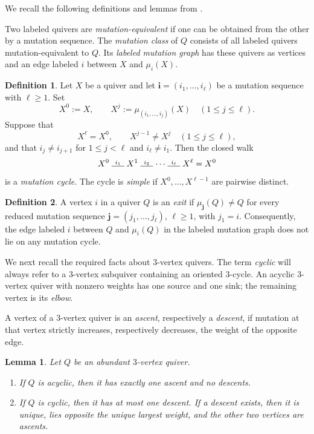\documentclass[10pt,a4paper]{amsart}
\newtheorem{lemma}[lemma]{Lemma}
\theoremstyle{definition}
\newtheorem{definition}[definition]{Definition}
\theoremstyle{definition}
\numberwithin{equation}{section}
\numberwithin{table}{section}
\begin{document}
We recall the following definitions and lemmas from \cite{FN25}.

Two labeled quivers are \emph{mutation-equivalent} if one can be obtained
from the other by a mutation sequence. The \emph{mutation class} of $Q$
consists of all labeled quivers mutation-equivalent to $Q$. Its \emph{labeled
mutation graph} has these quivers as vertices and an edge labeled $i$ between
$X$ and $\mu_i(X)$.

\begin{definition}\label{def:mutation-cycle}
Let $X$ be a quiver and let $\mathbf i=(i_1,\ldots,i_\ell)$ be a mutation
sequence with $\ell\geq1$. Set
\[
 X^0:=X,\qquad
 X^j:=\mu_{(i_1,\ldots,i_j)}(X)\quad(1\leq j\leq \ell).
\]
Suppose that
\[
 X^\ell=X^0,\qquad X^{j-1}\neq X^j\quad(1\leq j\leq \ell),
\]
and that $i_j\neq i_{j+1}$ for $1\leq j<\ell$ and $i_\ell\neq i_1$. Then the closed walk
\[
 X^0\mathrel{\mathop{\rule{1.5em}{0.4pt}}\limits^{i_1}}X^1
 \mathrel{\mathop{\rule{1.5em}{0.4pt}}\limits^{i_2}}\cdots
 \mathrel{\mathop{\rule{1.5em}{0.4pt}}\limits^{i_\ell}}X^\ell=X^0
\]
is a \emph{mutation cycle}. The cycle is
\emph{simple} if $X^0,\ldots,X^{\ell-1}$ are pairwise distinct.
\end{definition}

\begin{definition}\label{def:exit}
A vertex $i$ in a quiver $Q$ is an \emph{exit} if
$\mu_{\mathbf j}(Q)\neq Q$ for every reduced mutation sequence
$\mathbf j=(j_1,\ldots,j_\ell)$, $\ell\geq1$, with $j_1=i$.
Consequently, the edge labeled $i$ between $Q$ and $\mu_i(Q)$ in the labeled
mutation graph does not lie on any mutation cycle.
\end{definition}

We next recall the required facts about $3$-vertex quivers. The term
\emph{cyclic} will always refer to a $3$-vertex subquiver containing an
oriented $3$-cycle. An acyclic $3$-vertex quiver with nonzero weights has one
source and one sink; the remaining vertex is its \emph{elbow}.

A vertex of a $3$-vertex quiver is an \emph{ascent}, respectively a
\emph{descent}, if mutation at that vertex strictly increases, respectively
decreases, the weight of the opposite edge.

\begin{lemma}\label{lem:rank-three-descent}
Let $Q$ be an abundant $3$-vertex quiver.
\begin{enumerate}[label=\textup{(\roman*)},leftmargin=2.2em,itemsep=2pt]
\item If $Q$ is acyclic, then it has exactly one ascent and no descents.
\item If $Q$ is cyclic, then it has at most one descent. If a descent exists,
then it is unique, lies opposite the unique largest weight, and the other two
vertices are ascents.
\end{enumerate}
\end{lemma}
\end{document}
